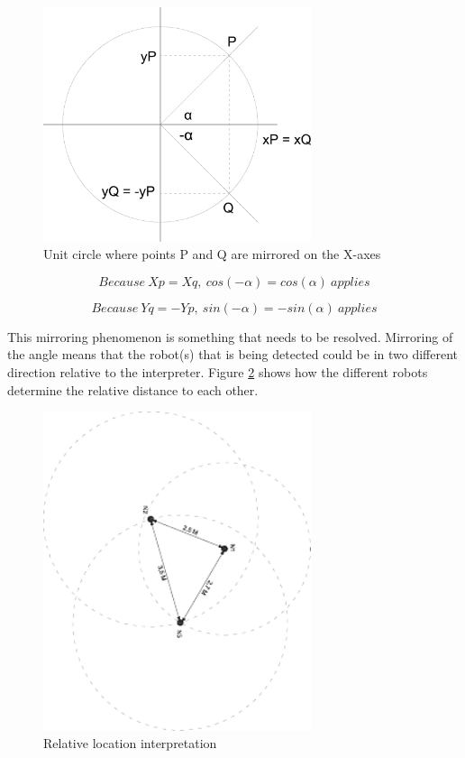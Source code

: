 \documentclass[10pt,a4paper]{article}
\begin{document}
\begin{figure}[H]
\centering
\includegraphics[width=0.7\textwidth]{Cirkel.pdf}
\caption{Unit circle where points P and Q are mirrored on the X-axes}
\label{circle}
\end{figure}

\begin{equation}
Because\ Xp = Xq,\ cos(-\alpha) = cos(\alpha)\ applies
\end{equation}

\begin{equation}
Because\ Yq = -Yp,\ sin(-\alpha) = -sin(\alpha)\ applies
\end{equation}

This mirroring phenomenon is something that needs to be resolved. Mirroring of the angle means that the robot(s) that is being detected could be in two different direction relative to the interpreter. Figure \ref{detectie} shows how the different robots determine the relative distance to each other. 

\begin{figure}[H]
\centering
\includegraphics[angle=90,width=0.7\textwidth]{Detectie.pdf}
\caption{Relative location interpretation}
\label{detectie}
\end{figure}
\end{document}
